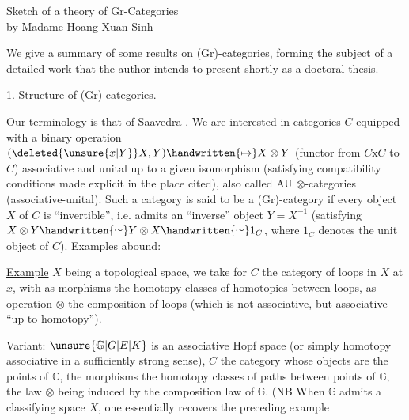 
\begin{center}
Sketch of a theory of Gr-Categories\\
by Madame Hoang Xuan Sinh
\end{center}

We give a summary of some results on (Gr)-categories, forming the subject of a detailed work that the author intends to present shortly as a doctoral thesis\handwritten{[\, ]}.

1. Structure of (Gr)-categories.

Our terminology is that of Saavedra \handwritten{[\, ]}. We are interested in categories $C$ equipped with a binary operation $(\deleted{\unsure{x|Y}}X,Y)\handwritten{\mapsto}X\otimes Y$ (functor from $C\mathbin{\mathrm{x}}C$ to $C$) associative and unital up to a given isomorphism (satisfying compatibility conditions made explicit in the place cited), also called AU $\otimes$-categories (associative-unital). Such a category is said to be a (Gr)-category if  every object $X$ of $C$ is ``invertible'', i.e. admits an ``inverse'' object $Y=X^{-1}$ (satisfying $X\otimes Y\handwritten{\simeq}Y\otimes X\handwritten{\simeq}1_C$, where $1_C$ denotes the unit object of $C$). Examples abound:

\uline{Example}  $X$ being a topological space, we take for $C$ the category of loops in $X$ at $x$, with as morphisms the homotopy classes of homotopies between loops, as operation $\otimes$ the composition of loops (which is not associative, but associative ``up to homotopy'').

Variant: $\unsure{\mathbb{G}|G|E|K}$ is an associative Hopf space (or simply homotopy associative in a sufficiently strong sense), $C$ the category whose objects are the points of $\mathbb{G}$, the morphisms the homotopy classes of paths between points of $\mathbb{G}$, the law $\otimes$ being induced by the composition law of $\mathbb{G}$. (NB When $\mathbb{G}$ admits a classifying space $X$, one essentially recovers the preceding example

